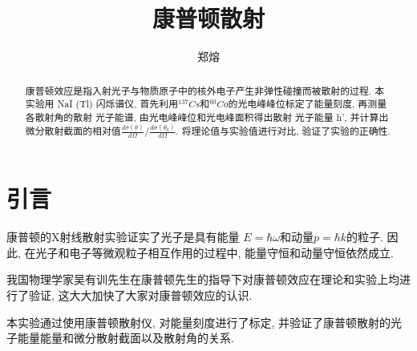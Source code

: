\documentclass[font=default]{mpltx}
\makeatletter
\newcommand{\note}[1]{{\color{gray}#1}}
\newcommand*\file[1]{\textbf{\texttt{#1}}}
\newcommand\releasedate{%
    \href{https://github.com/CastleStar14654/PKUMpLtX/releases/tag/\mpltx@fileversion}%
        {\mpltx@filedate, \mpltx@fileversion}}
\makeatother
\begin{document}
\title{康普顿散射} %
\author{郑熔} %
\date{}
\begin{abstract}
  康普顿效应是指入射光子与物质原子中的核外电子产生非弹性碰撞而被散射的过程. 
  本实验用 NaI (Tl) 闪烁谱仪, 首先利用$^{137}Cs$和$^{60}Co$的光电峰峰位标定了能量刻度, 再测量各散射角的散射 \gamma 光子能谱, 由光电峰峰位和光电峰面积得出散射 \gamma 光子能量 h\nu', 并计算出微分散射截面的相对值$\frac{d\sigma(\theta)}{d\Omega}/\frac{d\sigma(\theta_0)}{d\Omega}$.
  将理论值与实验值进行对比, 验证了实验的正确性. 
\end{abstract}

\maketitle

\section{引言}
康普顿的X射线散射实验证实了光子是具有能量 $E = \hbar \omega$和动量$p=\hbar k$的粒子. 因此, 在光子和电子等微观粒子相互作用的过程中, 能量守恒和动量守恒依然成立. 

我国物理学家吴有训先生在康普顿先生的指导下对康普顿效应在理论和实验上均进行了验证, 这大大加快了大家对康普顿效应的认识. 

本实验通过使用康普顿散射仪, 对能量刻度进行了标定, 并验证了康普顿散射的\gamma 光子能量能量和微分散射截面以及散射角的关系. 
\end{document}
